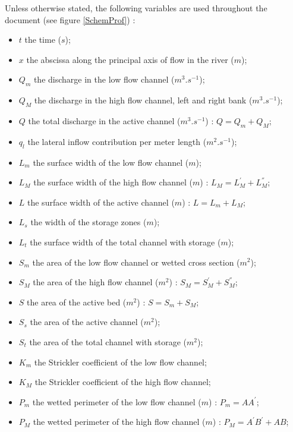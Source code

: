 Unless otherwise stated, the following variables are used throughout the document (see figure \ref{SchemProf}) :
\vspace{0.5cm}
\begin{itemize}
 \item $t$ the time ($s$);
 \item $x$ the abscissa along the principal axis of flow in the river ($m$);
\vspace{0.5cm}
 \item $Q_m$ the discharge in the low flow channel ($m^3.s^{-1}$);
 \item $Q_M$ the discharge in the high flow channel, left and right bank ($m^3.s^{-1}$);
 \item $Q$ the total discharge in the active channel ($m^3.s^{-1}$) : $Q = Q_m + Q_M$;
 \item $q_l$ the lateral inflow contribution per meter length ($m^2.s^{-1}$);
\vspace{0.5cm}
 \item $L_m$ the surface width of the low flow channel ($m$);
 \item $L_M$ the surface width of the high flow channel ($m$) : $L_M = L^{'}_{M} + L^{''}_M$;
 \item $L$ the surface width of the active channel ($m$) : $L = L_m + L_M$;
 \item $L_s$ the width of the storage zones ($m$);
 \item $L_t$ the surface width of the total channel with storage ($m$);
\vspace{0.5cm}
 \item $S_m$ the area of the low flow channel or wetted cross section ($m^2$);
 \item $S_M$ the area of the high flow channel ($m^2$) : $S_M = S^{'}_{M} + S^{''}_M$;
 \item $S$ the area of the active bed ($m^2$) : $S = S_m + S_M$;
 \item $S_s$ the area of the active channel ($m^2$);
 \item $S_t$ the area of the total channel with storage ($m^2$);
\vspace{0.5cm}
 \item $K_m$ the Strickler coefficient of the low flow channel;
 \item $K_M$ the Strickler coefficient of the high flow channel;
\vspace{0.5cm}
 \item $P_m$ the wetted perimeter of the low flow channel ($m$) : $P_m = AA^{'}$;
 \item $P_M$ the wetted perimeter of the high flow channel ($m$) : $P_M = A^{'}B^{'}+AB$;

\end{itemize}
